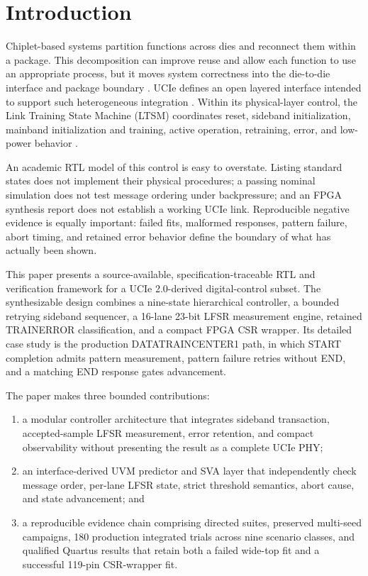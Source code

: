 \section{Introduction}
\label{sec:introduction}

Chiplet-based systems partition functions across dies and reconnect them within
a package. This decomposition can improve reuse and allow each function to use
an appropriate process, but it moves system correctness into the die-to-die
interface and package boundary
\cite{li2020chiplet,lau2021chiplets,mahajan2019emib}. UCIe
defines an open layered interface intended to support such heterogeneous
integration \cite{sharma2022ucie,sharma2023sop}. Within its physical-layer control, the Link
Training State Machine (LTSM) coordinates reset, sideband initialization,
mainband initialization and training, active operation, retraining, error, and
low-power behavior \cite{ucie20}.

An academic RTL model of this control is easy to overstate. Listing standard
states does not implement their physical procedures; a passing nominal
simulation does not test message ordering under backpressure; and an FPGA
synthesis report does not establish a working UCIe link. Reproducible negative
evidence is equally important: failed fits, malformed responses, pattern
failure, abort timing, and retained error behavior define the boundary of what
has actually been shown.

This paper presents a source-available, specification-traceable RTL and
verification framework for a UCIe 2.0-derived digital-control subset. The
synthesizable design combines a nine-state hierarchical controller, a bounded
retrying sideband sequencer, a 16-lane 23-bit LFSR measurement engine, retained
TRAINERROR classification, and a compact FPGA CSR wrapper. Its detailed case
study is the production DATATRAINCENTER1 path, in which START completion admits
pattern measurement, pattern failure retries without END, and a matching END
response gates advancement.

The paper makes three bounded contributions:

\begin{enumerate}
\item a modular controller architecture that integrates sideband transaction,
accepted-sample LFSR measurement, error retention, and compact observability
without presenting the result as a complete UCIe PHY;
\item an interface-derived UVM predictor and SVA layer that independently check
message order, per-lane LFSR state, strict threshold semantics, abort cause, and
state advancement; and
\item a reproducible evidence chain comprising directed suites, preserved
multi-seed campaigns, 180 production integrated trials across nine scenario
classes, and qualified Quartus results that retain both a failed wide-top fit
and a successful 119-pin CSR-wrapper fit.
\end{enumerate}

